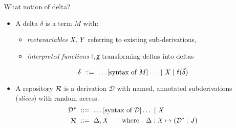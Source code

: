 \documentclass{beamer}
\theoremstyle{example}
\begin{document}
\begin{frame}{What notion of delta?}
  \begin{itemize}
  \item A \textcolor{greenish}{delta} $\delta$ is a term $M$ with:
    \begin{itemize}
    \item \emph{metavariables} $\text{\textit{X}}, \text{\textit{Y}}$ referring to existing
      sub-derivations,
    \item \emph{interpreted functions} $\mathsf{f, g}$ transforming
      deltas into deltas
    \end{itemize}

    $$ \delta \ ::=\  \ldots \text{[syntax of $M$]} \ldots \ |\ 
    \text{\textit{X}} \ |\  {\rm\mathsf{f}}({\vec\delta}) $$

    \pause
  \item A \textcolor{greenish}{repository} $\mathcal{R}$ is a derivation
    $\mathcal D$ with named, annotated subderivations (\emph{slices})
    with random access:
    \begin{align*}
      \mathcal D^* &\ ::=\  \ldots\text{[syntax of $\mathcal D$]}\ldots
      \ |\  \text{\textit{X}} \\
      \mathcal{R} &\ ::=\  \Delta, \text{\textit{X}} \qquad\text{where}\quad\Delta : \text{\textit{X}}\mapsto (\mathcal D^* : J)
    \end{align*}
  \end{itemize}
\end{frame}
\end{document}
